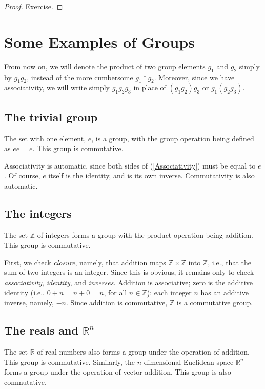 \documentclass{amsbook}
\theoremstyle{plain}
\numberwithin{equation}{chapter}
\numberwithin{theorem}{chapter}
\begin{document}
\begin{proof}
Exercise.
\end{proof}

\section{Some Examples of Groups\label{ex}}

From now on, we will denote the product of two group elements $g_{1}$ and
$g_{2}$ simply by $g_{1}g_{2}$, instead of the more cumbersome $g_{1}\ast
g_{2}$. Moreover, since we have associativity, we will write simply
$g_{1}g_{2}g_{3}$ in place of $(g_{1}g_{2})g_{3}$ or $g_{1}(g_{2}g_{3})$.

\subsection{The trivial group}

The set with one element, $e$, is a group, with the group operation being
defined as $ee=e$. This group is commutative.

Associativity is automatic, since both sides of (\ref{Associativity}) must be
equal to $e$. Of course, $e$ itself is the identity, and is its own inverse.
Commutativity is also automatic.

\subsection{The integers}

The set $\mathbb{Z}$ of integers forms a group with the product operation
being addition. This group is commutative.

First, we check \textit{closure}, namely, that addition maps $\mathbb{Z}%
\times\mathbb{Z}$ into $\mathbb{Z}$, i.e., that the sum of two integers is an
integer. Since this is obvious, it remains only to check
\textit{associativity}, \textit{identity}, and \textit{inverses}. Addition is
associative; zero is the additive identity (i.e., $0+n=n+0=n$, for all
$n\in\mathbb{Z}$); each integer $n$ has an additive inverse, namely, $-n$.
Since addition is commutative, $\mathbb{Z}$ is a commutative group.

\subsection{The reals and $\mathbb{R}^{n}$}

The set $\mathbb{R}$ of real numbers also forms a group under the operation of
addition. This group is commutative. Similarly, the $n$-dimensional Euclidean
space $\mathbb{R}^{n}$ forms a group under the operation of vector addition.
This group is also commutative.
\end{document}
